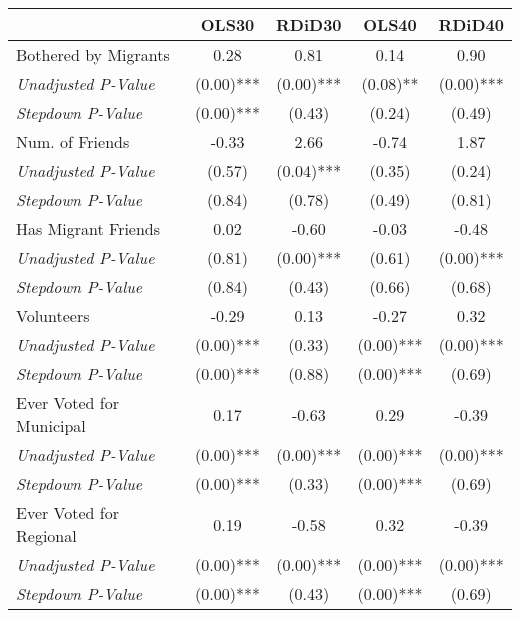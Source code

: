 \begin{tabular}{l c c c c}
\toprule
 & OLS30 & RDiD30 & OLS40 & RDiD40 \\
\midrule
Bothered by Migrants & 0.28 & 0.81 & 0.14 & 0.90 \\
\quad \textit{Unadjusted P-Value} & (0.00)*** & (0.00)*** & (0.08)** & (0.00)*** \\
\quad \textit{Stepdown P-Value} & (0.00)*** & (0.43) & (0.24) & (0.49) \\
Num. of Friends & -0.33 & 2.66 & -0.74 & 1.87 \\
\quad \textit{Unadjusted P-Value} & (0.57) & (0.04)*** & (0.35) & (0.24) \\
\quad \textit{Stepdown P-Value} & (0.84) & (0.78) & (0.49) & (0.81) \\
Has Migrant Friends & 0.02 & -0.60 & -0.03 & -0.48 \\
\quad \textit{Unadjusted P-Value} & (0.81) & (0.00)*** & (0.61) & (0.00)*** \\
\quad \textit{Stepdown P-Value} & (0.84) & (0.43) & (0.66) & (0.68) \\
Volunteers & -0.29 & 0.13 & -0.27 & 0.32 \\
\quad \textit{Unadjusted P-Value} & (0.00)*** & (0.33) & (0.00)*** & (0.00)*** \\
\quad \textit{Stepdown P-Value} & (0.00)*** & (0.88) & (0.00)*** & (0.69) \\
Ever Voted for Municipal & 0.17 & -0.63 & 0.29 & -0.39 \\
\quad \textit{Unadjusted P-Value} & (0.00)*** & (0.00)*** & (0.00)*** & (0.00)*** \\
\quad \textit{Stepdown P-Value} & (0.00)*** & (0.33) & (0.00)*** & (0.69) \\
Ever Voted for Regional & 0.19 & -0.58 & 0.32 & -0.39 \\
\quad \textit{Unadjusted P-Value} & (0.00)*** & (0.00)*** & (0.00)*** & (0.00)*** \\
\quad \textit{Stepdown P-Value} & (0.00)*** & (0.43) & (0.00)*** & (0.69) \\
\bottomrule
\end{tabular}

